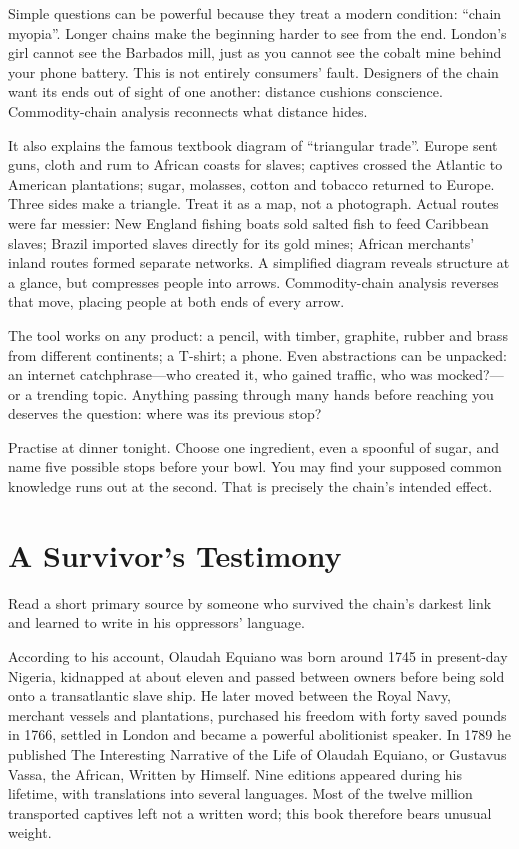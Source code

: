 Simple questions can be powerful because they treat a modern condition: ``chain myopia''. Longer chains make the beginning harder to see from the end. London's girl cannot see the Barbados mill, just as you cannot see the cobalt mine behind your phone battery. This is not entirely consumers' fault. Designers of the chain want its ends out of sight of one another: distance cushions conscience. Commodity-chain analysis reconnects what distance hides.

It also explains the famous textbook diagram of ``triangular trade''. Europe sent guns, cloth and rum to African coasts for slaves; captives crossed the Atlantic to American plantations; sugar, molasses, cotton and tobacco returned to Europe. Three sides make a triangle. Treat it as a map, not a photograph. Actual routes were far messier: New England fishing boats sold salted fish to feed Caribbean slaves; Brazil imported slaves directly for its gold mines; African merchants' inland routes formed separate networks. A simplified diagram reveals structure at a glance, but compresses people into arrows. Commodity-chain analysis reverses that move, placing people at both ends of every arrow.

The tool works on any product: a pencil, with timber, graphite, rubber and brass from different continents; a T-shirt; a phone. Even abstractions can be unpacked: an internet catchphrase---who created it, who gained traffic, who was mocked?---or a trending topic. Anything passing through many hands before reaching you deserves the question: where was its previous stop?

Practise at dinner tonight. Choose one ingredient, even a spoonful of sugar, and name five possible stops before your bowl. You may find your supposed common knowledge runs out at the second. That is precisely the chain's intended effect.

\section{A Survivor's Testimony}
Read a short primary source by someone who survived the chain's darkest link and learned to write in his oppressors' language.

According to his account, Olaudah Equiano was born around 1745 in present-day Nigeria, kidnapped at about eleven and passed between owners before being sold onto a transatlantic slave ship. He later moved between the Royal Navy, merchant vessels and plantations, purchased his freedom with forty saved pounds in 1766, settled in London and became a powerful abolitionist speaker. In 1789 he published The Interesting Narrative of the Life of Olaudah Equiano, or Gustavus Vassa, the African, Written by Himself. Nine editions appeared during his lifetime, with translations into several languages. Most of the twelve million transported captives left not a written word; this book therefore bears unusual weight.

